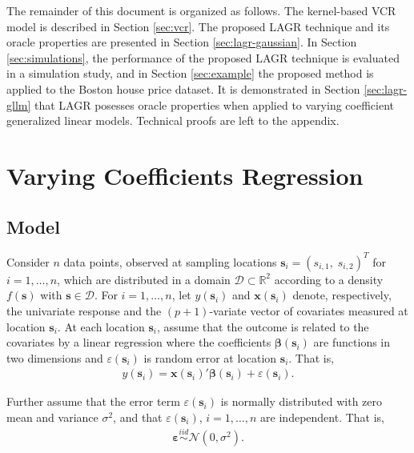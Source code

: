 \documentclass[authoryear,review, 12pt]{elsarticle}
\begin{document}
The remainder of this document is organized as follows. The kernel-based
VCR model is described in Section \ref{sec:vcr}. The proposed LAGR
technique and its oracle properties are presented in Section \ref{sec:lagr-gaussian}.
In Section \ref{sec:simulations}, the performance of the proposed
LAGR technique is evaluated in a simulation study, and in Section
\ref{sec:example} the proposed method is applied to the Boston house
price dataset. It is demonstrated in Section \ref{sec:lagr-gllm}
that LAGR posesses oracle properties when applied to varying coefficient
generalized linear models. Technical proofs are left to the appendix.


\section{Varying Coefficients Regression\label{sec:vcr}}


\subsection{Model}

Consider $n$ data points, observed at sampling locations $\bm{s}_{i}=(s_{i,1},\; s_{i,2})^{T}$
for $i=1,\dots,n$, which are distributed in a domain $\mathcal{D}\subset\mathbb{R}^{2}$
according to a density $f(\bm{s})$ with $\bm{s}\in\mathcal{D}$.
For $i=1,\dots,n$, let $y(\bm{s}_{i})$ and $\bm{x}(\bm{s}_{i})$
denote, respectively, the univariate response and the $(p+1)$-variate
vector of covariates measured at location $\bm{s}_{i}$. At each location
$\bm{s}_{i}$, assume that the outcome is related to the covariates
by a linear regression where the coefficients $\bm{\beta}(\bm{s}_{i})$
are functions in two dimensions and $\varepsilon(\bm{s}_{i})$ is
random error at location $\bm{s}_{i}$. That is, 
\begin{align}
y(\bm{s}_{i})=\bm{x}(\bm{s}_{i})'\bm{\beta}(\bm{s}_{i})+\varepsilon(\bm{s}_{i}).\label{eq:lm(s)}
\end{align}


Further assume that the error term $\varepsilon(\bm{s}_{i})$ is normally
distributed with zero mean and variance $\sigma^{2}$, and that $\varepsilon(\bm{s}_{i})$,
$i=1,\dots,n$ are independent. That is, 
\begin{align}
\bm{\varepsilon}\overset{iid}{\sim}\mathcal{N}\left(0,\sigma^{2}\right).\label{eq:err}
\end{align}
\end{document}
